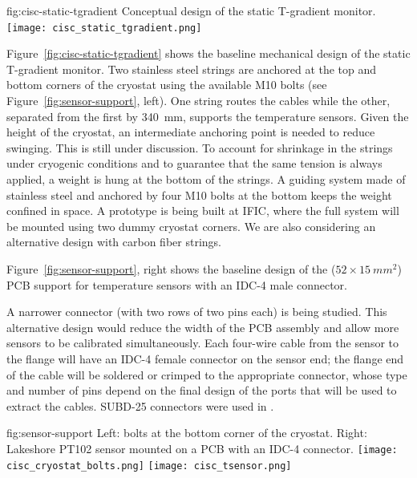 \begin{dunefigure}
{fig:cisc-static-tgradient}
  {Conceptual design of the static T-gradient monitor.}
  \texttt{[image: cisc\_static\_tgradient.png]}
\end{dunefigure}

Figure~\ref{fig:cisc-static-tgradient} shows the baseline mechanical design of
the static T-gradient monitor. Two stainless steel strings are anchored at the top and bottom corners of the cryostat
using the available M10 bolts (see Figure~\ref{fig:sensor-support}, left). One string routes the cables while the other,
separated from the first by \SI{340}{mm},  supports the temperature sensors.
Given the height of the cryostat, an intermediate anchoring point is needed to reduce swinging. This is still under discussion. To account for shrinkage in the strings under cryogenic conditions and to guarantee that the same tension is always applied, a weight is hung at the bottom of the strings. A guiding system made of stainless steel and anchored by four M10 bolts at the bottom keeps the weight confined in space. A prototype is being built at IFIC, where the full system will be mounted using two dummy cryostat corners. We are also considering an alternative design with carbon fiber strings.  


Figure~\ref{fig:sensor-support}, right shows the baseline design of the ($52\times \SI{15}{mm^2}$) 
PCB support for temperature sensors with an IDC-4 male connector. %

A narrower connector (with two rows of two pins each) is being studied. This alternative design would reduce the width of the PCB assembly and allow more sensors to be calibrated simultaneously. Each four-wire cable from the sensor to the flange will have an IDC-4 female connector on the sensor end; the flange end of the cable will be soldered or crimped to the appropriate connector, whose type and number of pins  depend on the final design of the  ports that will be used to extract the cables. SUBD-25 connectors were used in .

\begin{dunefigure}{fig:sensor-support}
  {Left: bolts at the bottom corner of the cryostat. Right: Lakeshore PT102 sensor mounted on a PCB with an IDC-4 connector.}
  \texttt{[image: cisc\_cryostat\_bolts.png]}%
    \hspace{1cm}%
  \texttt{[image: cisc\_tsensor.png]}%
\end{dunefigure}




